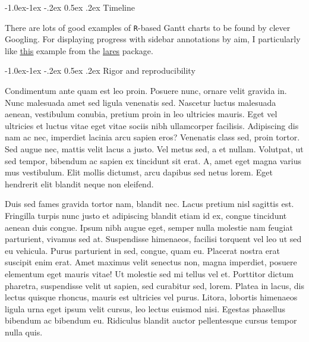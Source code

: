 \documentclass[11pt,]{article}
\makeatletter
\renewcommand\subsubsection{
  \@startsection{subsubsection}{3}{\z@}
    {-1.0ex\@plus -1ex \@minus -.2ex}%
    {0.5ex \@plus .2ex}%
    {\normalfont\normalsize\bf}} %
\makeatother
\begin{document}
\hypertarget{timeline}{%
\subsubsection{Timeline}\label{timeline}}

There are lots of good examples of \texttt{R}-based Gantt charts to be
found by clever Googling. For displaying progress with sidebar
annotations by aim, I particularly like
\href{https://datascienceplus.com/visualize-your-cvs-timeline-with-r-gantt-style/}{\underline{this}}
example from the
\href{https://github.com/laresbernardo/lares}{\underline{lares}}
package.

\hypertarget{rigor-and-reproducibility}{%
\subsubsection{Rigor and
reproducibility}\label{rigor-and-reproducibility}}

Condimentum ante quam est leo proin. Posuere nunc, ornare velit gravida
in. Nunc malesuada amet sed ligula venenatis sed. Nascetur luctus
malesuada aenean, vestibulum conubia, pretium proin in leo ultricies
mauris. Eget vel ultricies et luctus vitae eget vitae sociis nibh
ullamcorper facilisis. Adipiscing dis nam ac nec, imperdiet lacinia arcu
sapien eros? Venenatis class sed, proin tortor. Sed augue nec, mattis
velit lacus a justo. Vel metus sed, a et nullam. Volutpat, ut sed
tempor, bibendum ac sapien ex tincidunt sit erat. A, amet eget magna
varius mus vestibulum. Elit mollis dictumst, arcu dapibus sed netus
lorem. Eget hendrerit elit blandit neque non eleifend.

Duis sed fames gravida tortor nam, blandit nec. Lacus pretium nisl
sagittis est. Fringilla turpis nunc justo et adipiscing blandit etiam id
ex, congue tincidunt aenean duis congue. Ipsum nibh augue eget, semper
nulla molestie nam feugiat parturient, vivamus sed at. Suspendisse
himenaeos, facilisi torquent vel leo ut sed eu vehicula. Purus
parturient in sed, congue, quam eu. Placerat nostra erat suscipit enim
erat. Amet maximus velit senectus non, magna imperdiet, posuere
elementum eget mauris vitae! Ut molestie sed mi tellus vel et. Porttitor
dictum pharetra, suspendisse velit ut sapien, sed curabitur sed, lorem.
Platea in lacus, dis lectus quisque rhoncus, mauris est ultricies vel
purus. Litora, lobortis himenaeos ligula urna eget ipsum velit cursus,
leo lectus euismod nisi. Egestas phasellus bibendum ac bibendum eu.
Ridiculus blandit auctor pellentesque cursus tempor nulla quis.
\end{document}
